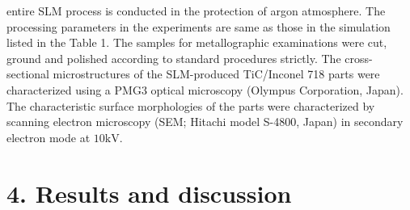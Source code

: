 \documentclass[10pt]{article}
\begin{document}
entire SLM process is conducted in the protection of argon atmosphere. The processing parameters in the experiments are same as those in the simulation listed in the Table 1. The samples for metallographic examinations were cut, ground and polished according to standard procedures strictly. The cross-sectional microstructures of the SLM-produced TiC/Inconel 718 parts were characterized using a PMG3 optical microscopy (Olympus Corporation, Japan). The characteristic surface morphologies of the parts were characterized by scanning electron microscopy (SEM; Hitachi model S-4800, Japan) in secondary electron mode at $10 \mathrm{kV}$.

\section*{4. Results and discussion}
\end{document}
